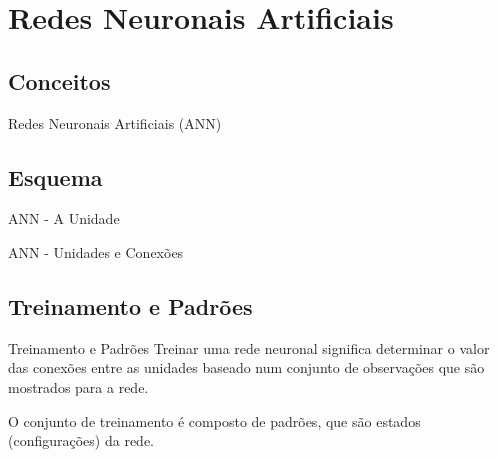 \section{Redes Neuronais Artificiais}

\subsection{Conceitos}
\begin{frame}{Redes Neuronais Artificiais (ANN)}%
  \justifying%
  
\end{frame}

\subsection{Esquema}
\begin{frame}{ANN - A Unidade}%
\end{frame}

\begin{frame}{ANN - Unidades e Conexões}%
\end{frame}

\subsection{Treinamento e Padrões}%
\begin{frame}{Treinamento e Padrões}%
  \justifying%
  Treinar uma rede neuronal significa determinar o valor das conexões entre as unidades baseado num conjunto de observações que são mostrados para a rede.

  O conjunto de treinamento é composto de padrões, que são estados (configurações) da rede.
\end{frame}
